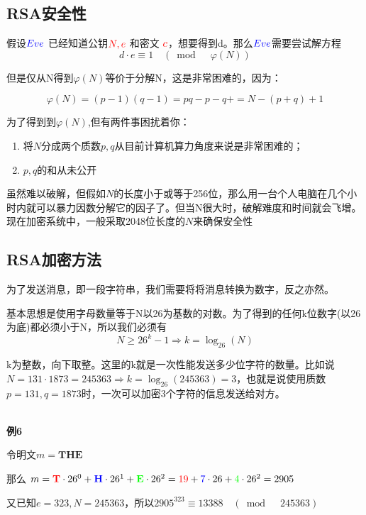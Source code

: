 \documentclass{article}
\begin{document}
\subsection{RSA安全性}

假设${\color{blue}Eve}$ 已经知道公钥${\color{red}N,e}$ 和密文 ${\color{red}c}$，想要得到d。那么${\color{blue}Eve}$需要尝试解方程
$$d \cdot e \equiv 1 \quad (\bmod \quad \varphi(N))$$

但是仅从N得到$\varphi(N)$等价于分解N，这是非常困难的，因为：


$$\varphi(N)  = (p-1)(q-1)=pq - p -q + = N -(p+q)+1$$

为了得到到$\varphi(N)$,但有两件事困扰着你：
\begin{enumerate}
\item 将$N$分成两个质数$p,q$从目前计算机算力角度来说是非常困难的；
\item $p,q$的和从未公开
\end{enumerate}

虽然难以破解，但假如${\displaystyle N}$的长度小于或等于256位，那么用一台个人电脑在几个小时内就可以暴力因数分解它的因子了。但当N很大时，破解难度和时间就会飞增。现在加密系统中，一般采取2048位长度的${\displaystyle N}$来确保安全性

\subsection{RSA加密方法}

为了发送消息，即一段字符串，我们需要将将消息转换为数字，反之亦然。

基本思想是使用字母数量等于N以26为基数的对数。为了得到的任何k位数字(以26为底)都必须小于N，所以我们必须有
$$N \ge 26^k - 1 \Rightarrow k = \log_26(N)$$

k为整数，向下取整。这里的k就是一次性能发送多少位字符的数量。比如说$N =131 \cdot 1873 = 245363 \Rightarrow k = \log_26(245363) = 3$，也就是说使用质数$p=131,q=1873$时，一次可以加密3个字符的信息发送给对方。

~\\

\textbf{例6}

令明文$m = \textbf{THE}$

那么 $m = {\color{red}\textbf{T}} \cdot 26^0 + {\color{blue}\textbf{H}} \cdot 26^1 +  {\color{green}\textbf{E}} \cdot 26^2 = {\color{red}19} + {\color{blue}7} \cdot 26 + {\color{green}4} \cdot 26^2 = 2905$

又已知$e = 323,N = 245363$，所以$2905^323 \equiv 13388 \quad (\bmod \quad 245363)$
\end{document}
